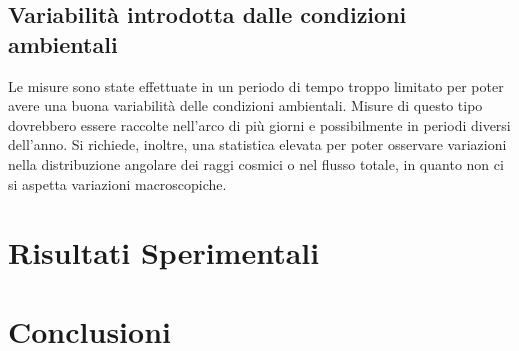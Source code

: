 \documentclass[8pt]{extarticle}
\begin{document}
\subsection{Variabilità introdotta dalle condizioni ambientali}
Le misure sono state effettuate in un periodo di tempo troppo limitato per poter avere una buona variabilità delle condizioni ambientali. Misure di questo tipo dovrebbero essere raccolte nell'arco di più giorni e possibilmente in periodi diversi dell'anno. Si richiede, inoltre, una statistica elevata per poter osservare variazioni nella distribuzione angolare dei raggi cosmici o nel flusso totale, in quanto non ci si aspetta variazioni macroscopiche.


\section{Risultati Sperimentali}
\section{Conclusioni}


\end{document}
